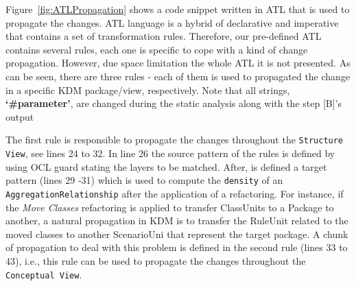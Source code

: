 Figure~\ref{fig:ATLPropagation} shows a code snippet written in ATL that is used to propagate the changes. ATL language is a hybrid of declarative and imperative that contains a set of transformation rules. Therefore, our pre-defined ATL contains several rules, each one is specific to cope with a kind of change propagation. However, due space limitation the whole ATL it is not presented. As can be seen, there are three rules - each of them is used to propagated the change in a specific KDM package/view, respectively. Note that all strings, \textbf{`\#parameter'}, are changed during the static analysis along with the step [B]'s output

The first rule is responsible to propagate the changes throughout the \texttt{Structure View}, see lines 24 to 32. In line 26 the source pattern of the rules is defined by using OCL guard stating the layers to be matched. After, is defined a target pattern (lines 29 -31) which is used to compute the \texttt{density} of an \texttt{AggregationRelationship} after the application of a refactoring. For instance, if the \textit{Move Classes} refactoring is applied to transfer ClassUnits to a Package to another, a natural propagation in KDM is to transfer the RuleUnit related to the moved classes to another ScenarioUni that represent the target package. A chunk of propagation to deal with this problem is defined in the second rule (lines 33 to 43), i.e., this rule can be used to propagate the changes throughout the \texttt{Conceptual View}.

